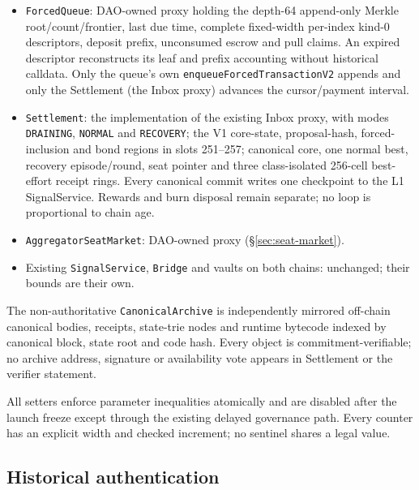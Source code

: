 \documentclass[a4paper,11pt]{article}
\newcommand{\code}[1]{\nolinkurl{#1}}
\begin{document}
\begin{itemize}
exactly eight cells; payable open selects one caller-hinted FREE cell and never
runs maintenance.  Expiry performs no callback, and surplus-sweep
failure cannot gate any protocol transition.
\item \code{ForcedQueue}: DAO-owned proxy holding the depth-64
append-only Merkle root/count/frontier, last due time, complete fixed-width
per-index kind-0 descriptors, deposit prefix, unconsumed escrow and pull
claims.  An expired descriptor reconstructs its leaf and prefix accounting
without historical calldata.  Only the queue's own \code{enqueueForcedTransactionV2}
appends and only the Settlement (the Inbox proxy) advances the cursor/payment
interval.
\item \code{Settlement}: the implementation of the existing Inbox proxy, with
modes \code{DRAINING}, \code{NORMAL} and \code{RECOVERY}; the V1 core-state,
proposal-hash, forced-inclusion and bond regions in slots 251--257; canonical
core, one normal best, recovery episode/round, seat pointer and three
class-isolated 256-cell best-effort receipt rings.  Every canonical commit
writes one checkpoint to the L1 SignalService.  Rewards and burn disposal
remain separate; no loop is proportional to chain age.
\item \code{AggregatorSeatMarket}: DAO-owned proxy (\S\ref{sec:seat-market}).
\item Existing \code{SignalService}, \code{Bridge} and vaults on both chains:
unchanged; their bounds are their own.
\end{itemize}

The non-authoritative \code{CanonicalArchive} is independently mirrored
off-chain canonical bodies, receipts, state-trie nodes and runtime bytecode
indexed by canonical block, state root and code hash.  Every object is
commitment-verifiable; no archive address, signature or availability vote
appears in Settlement or the verifier statement.

All setters enforce parameter inequalities atomically and are disabled after
the launch freeze except through the existing delayed governance path.  Every
counter has an explicit width and checked increment; no sentinel shares a legal
value.

\subsection{Historical authentication}
\end{document}
